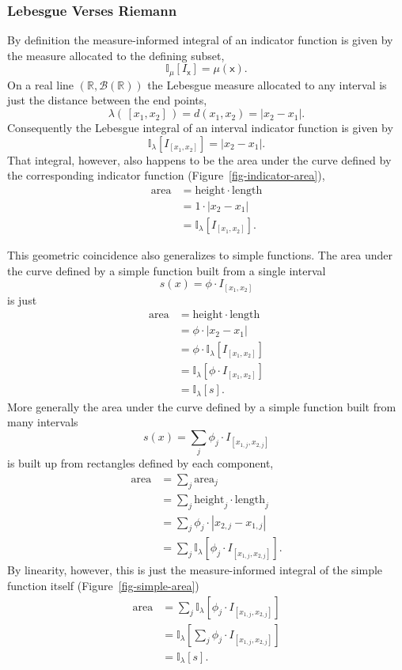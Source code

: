 \documentclass[
  letterpaper,
  DIV=11,
  numbers=noendperiod]{scrartcl}
\begin{document}
\hypertarget{lebesgue-verses-riemann}{%
\subsubsection{Lebesgue Verses Riemann}\label{lebesgue-verses-riemann}}

By definition the measure-informed integral of an indicator function is
given by the measure allocated to the defining subset, \[
\mathbb{I}_{\mu}[I_{\mathsf{x}}] = \mu(\mathsf{x}).
\] On a real line \((\mathbb{R}, \mathcal{B}(\mathbb{R}))\) the Lebesgue
measure allocated to any interval is just the distance between the end
points, \[
\lambda( \, [x_{1}, x_{2}] \, ) = d(x_{1}, x_{2}) = | x_{2} - x_{1} |.
\] Consequently the Lebesgue integral of an interval indicator function
is given by \[
\mathbb{I}_{\lambda}[I_{[x_{1}, x_{2}]}]
=
| x_{2} - x_{1} |.
\] That integral, however, also happens to be the area under the curve
defined by the corresponding indicator function
(Figure~\ref{fig-indicator-area}), \begin{align*}
\text{area}
&= \text{height} \cdot \text{length}
\\
&= 1 \cdot | x_{2} - x_{1} |
\\
&= \mathbb{I}_{\lambda}[I_{[x_{1}, x_{2}]}].
\end{align*}

This geometric coincidence also generalizes to simple functions. The
area under the curve defined by a simple function built from a single
interval \[
s(x) = \phi \cdot I_{[x_{1}, x_{2}]}
\] is just \begin{align*}
\text{area}
&= \text{height} \cdot \text{length}
\\
&= \phi \cdot | x_{2} - x_{1} |
\\
&= \phi \cdot \mathbb{I}_{\lambda}[I_{[x_{1}, x_{2}]}]
\\
&= \mathbb{I}_{\lambda}[\phi \cdot I_{[x_{1}, x_{2}]}]
\\
&= \mathbb{I}_{\lambda}[s].
\end{align*} More generally the area under the curve defined by a simple
function built from many intervals \[
s(x) = \sum_{j} \phi_{j} \cdot I_{[x_{1, j}, x_{2, j}]}
\] is built up from rectangles defined by each component, \begin{align*}
\text{area}
&= \sum_{j} \text{area}_{j}
\\
&= \sum_{j} \text{height}_{j} \cdot \text{length}_{j}
\\
&= \sum_{j} \phi_{j} \cdot | x_{2, j} - x_{1, j} |
\\
&= \sum_{j} \mathbb{I}_{\lambda}[\phi_{j} \cdot I_{[x_{1, j}, x_{2, j}]}].
\end{align*} By linearity, however, this is just the measure-informed
integral of the simple function itself (Figure~\ref{fig-simple-area})
\begin{align*}
\text{area}
&=
\sum_{j} \mathbb{I}_{\lambda}[\phi_{j} \cdot I_{[x_{1, j}, x_{2, j}]}]
\\
&=
\mathbb{I}_{\lambda}[\sum_{j} \phi_{j} \cdot I_{[x_{1, j}, x_{2, j}]}]
\\
&= \mathbb{I}_{\lambda}[s].
\end{align*}
\end{document}
